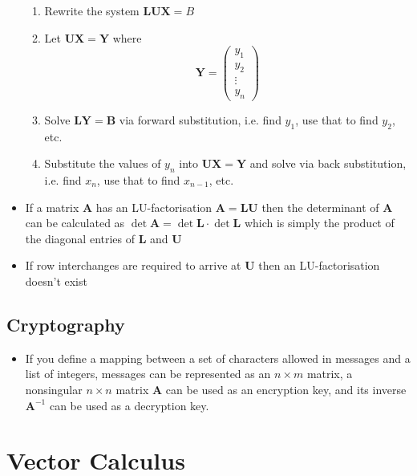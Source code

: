 \documentclass{article}
\begin{document}
\begin{itemize}
        \begin{enumerate}
          \item Rewrite the system $\mathbf{L U X} = B$

          \item Let $\mathbf{U X = Y}$ where \[\mathbf{Y} = \begin{pmatrix}
                    y_1    \\
                    y_2    \\
                    \vdots \\
                    y_n
                  \end{pmatrix}\]

          \item Solve $\mathbf{L Y = B}$ via forward substitution, i.e. find $y_1$, use that to find $y_2$, etc.

          \item Substitute the values of $y_n$ into $\mathbf{U X = Y}$ and solve via back substitution, i.e. find $x_n$, use that to find $x_{n - 1}$, etc.
        \end{enumerate}

  \item If a matrix $\mathbf{A}$ has an LU-factorisation $\mathbf{A = L U}$ then the determinant of $\mathbf{A}$ can be calculated as $\det \mathbf{A} = \det \mathbf{L} \cdot \det \mathbf{L}$ which is simply the product of the diagonal entries of $\mathbf{L}$ and $\mathbf{U}$

  \item If row interchanges are required to arrive at $\mathbf{U}$ then an LU-factorisation doesn't exist
\end{itemize}

\subsection{Cryptography}

\begin{itemize}
  \item If you define a mapping between a set of characters allowed in messages and a list of integers, messages can be represented as an $n \times m$ matrix, a nonsingular $n \times n$ matrix $\mathbf{A}$ can be used as an encryption key, and its inverse $\mathbf{A}^{-1}$ can be used as a decryption key.
\end{itemize}

\section{Vector Calculus}
\end{document}
